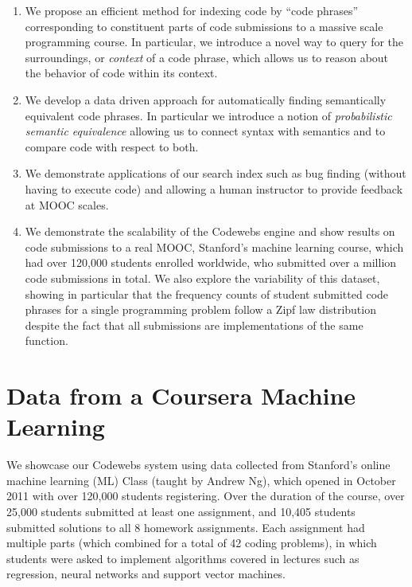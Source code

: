 \begin{enumerate}
\item We propose an efficient method for indexing code by ``code phrases'' corresponding to constituent parts
of code submissions to a massive scale programming course.  In particular, we introduce a novel way to query for the surroundings, or \emph{context} of a code phrase, 
which allows us to reason about the behavior of code within its context.
\item We develop a data driven approach for automatically finding semantically equivalent code phrases.
In particular we introduce a notion of \emph{probabilistic semantic equivalence} allowing
us to connect syntax with semantics and to compare code with respect to both.
\item We demonstrate applications of our search index
such as bug finding (without having to execute code) and 
allowing a human instructor to  provide feedback at MOOC scales.
\item We demonstrate the scalability of the Codewebs engine and show results on code submissions to a real MOOC, Stanford's machine learning course,
which  had over 120,000 students enrolled worldwide, who submitted over a million code submissions in total.
We also explore the variability of this dataset, showing in particular that the frequency counts of  
student submitted code phrases for a single programming problem follow a Zipf law distribution despite the
fact that all submissions are implementations of the same function.
\end{enumerate}






\section{Data from a Coursera Machine Learning}\label{sec:dataset}
We showcase our Codewebs system using data collected from 
Stanford's online machine learning (ML) Class (taught by Andrew Ng), 
which opened in October 2011 with over 
120,000 students registering. Over the duration of the course,
over 25,000 students submitted at least one assignment, and 
10,405 students submitted solutions to all 8 homework assignments.  Each
assignment had multiple parts (which combined for a total of 42 
coding problems), in which students were asked to implement algorithms covered in lectures such as regression, neural networks and support vector machines.

